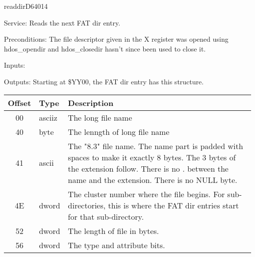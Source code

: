 \newpage
\begin{hyppotrap}{readdir}{D640}{14}
\item [Service:]
  Reads the next FAT dir entry.
\item [Preconditions:]
  The file descriptor given in the X register was opened using hdos\_opendir
  and hdos\_closedir hasn't since been used to close it.
\item [Inputs:]
\item [Outputs:]
  Starting at \$YY00, the FAT dir entry has this structure.
  {\setlength{\tabcolsep}{2mm}
  \begin{tabular}{|c|l|p{6.9cm}|}
  \hline
  \textbf{Offset} & \textbf{Type} & \textbf{Description}
  \\\hline
  00 & asciiz & The long file name
  \\
  40 & byte & The lenngth of long file name
  \\
  41 & ascii & The "8.3" file name. The name part is padded with spaces to make
               it exactly 8 bytes. The 3 bytes of the extension follow. There is
               no . between the name and the extension. There is no NULL byte.
  \\
  4E & dword & The cluster number where the file begins. For sub-directories,
               this is where the FAT dir entries start for that sub-directory.
  \\
  52 & dword & The length of file in bytes.
  \\
  56 & dword & The type and attribute bits.
  \\\hline
  \end{tabular}
  }


\end{hyppotrap}
